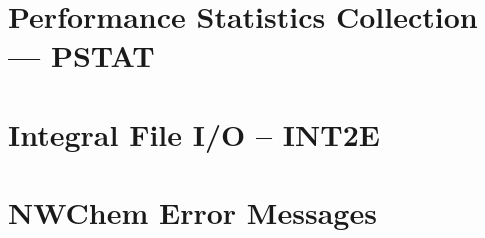 \chapter{Performance Statistics Collection --- PSTAT}


\chapter{Integral File I/O -- INT2E}


\chapter{NWChem Error Messages}



